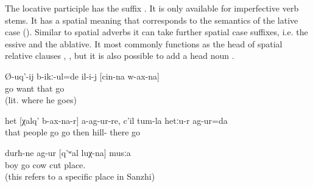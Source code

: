 The locative participle has the suffix . It is only available for imperfective verb stems. It has a spatial meaning that corresponds to the semantics of the lative case (). Similar to spatial adverbs it can take further spatial case suffixes, i.e. the essive and the ablative. It most commonly functions as the head of spatial relative clauses , , but it is also possible to add a head noun .
%
\begin{exe}
	\ex	\label{ex:‎He wanted to go his way (where he is going)}
	\gll	Ø-uq'-ij	b-ikː-ul=de	il-i-j	[cin-na	w-ax-na]\\
		go	want	that		go\\
	\glt	{} (lit. where he goes)

	\ex	\label{ex:‎‎I did not go through where the people (normally) go, but through where the hill is}
	\gll	het	[χalq'	b-ax-na-r]	a-ag-ur-re,	c'il	tum-la	hetːu-r	ag-ur=da\\
		that	people	go	go	then	hill-	there	go\\
	\glt	{}

	\ex	\label{ex:‎‎‎The boys went to the place where cows are slaughtered}
	\gll	durħ-ne	ag-ur	[q'ʷal	luχ-na]	musːa\\
		boy	go	cow	cut	place.\\
	\glt	{} (this refers to a specific place in Sanzhi)
\end{exe}

